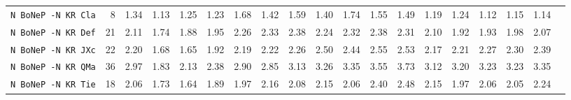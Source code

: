 \begin{tabular}{l | r @{~~} r | r@{~~}r@{~~}r@{~~}r@{~~}r@{~~}r@{~~}r@{~~}r@{~~}r@{~~}r@{~~}r@{~~}r@{~~}r@{~~}r@{~~}r@{~~}r|}
\verb+N BoNeP -N KR Cla+ & 8 & 1.34 & 1.13&1.25&1.23&1.68&1.42&1.59&1.40&1.74&1.55&1.49&1.19&1.24&1.12&1.15&1.14\\
\verb+N BoNeP -N KR Def+ & 21 & 2.11 & 1.74&1.88&1.95&2.26&2.33&2.38&2.24&2.32&2.38&2.31&2.10&1.92&1.93&1.98&2.07\\
\verb+N BoNeP -N KR JXc+ & 22 & 2.20 & 1.68&1.65&1.92&2.19&2.22&2.26&2.50&2.44&2.55&2.53&2.17&2.21&2.27&2.30&2.39\\
\verb+N BoNeP -N KR QMa+ & 36 & 2.97 & 1.83&2.13&2.38&2.90&2.85&3.13&3.26&3.35&3.55&3.73&3.12&3.20&3.23&3.23&3.35\\
\verb+N BoNeP -N KR Tie+ & 18 & 2.06 & 1.73&1.64&1.89&1.97&2.16&2.08&2.15&2.06&2.40&2.48&2.15&1.97&2.06&2.05&2.24\\
\end{tabular}
